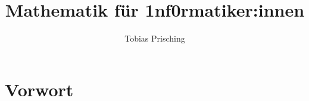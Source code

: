 \documentclass[a4paper,12pt,ngerman]{scrreprt}
\title{Mathematik für 1nf0rmatiker:innen}
\author{Tobias Prisching}
\date{ }
\begin{document}
	
	\maketitle
	
	\newpage

	\tableofcontents

	\newpage
	\chapter*{Vorwort}\label{kapitel:vorwort}
	
	
\end{document}
